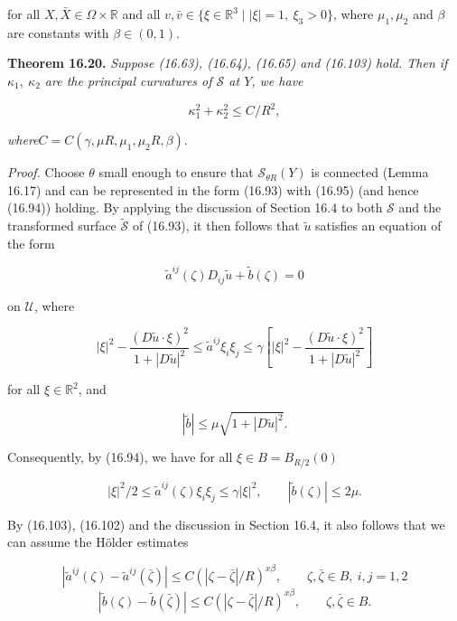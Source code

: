 for all $X,\bar X\in\Omega\times\mathbb{R}$ and all $v,\bar v\in\{\xi\in\mathbb{R}^3\mid |\xi|=1,\ \xi_3>0\}$, where $\mu_1,\mu_2$ and $\beta$ are
constants with $\beta\in(0,1)$.

\textbf{Theorem 16.20.} \textit{Suppose (16.63), (16.64), (16.65) and (16.103) hold. Then if $\kappa_1,\ \kappa_2$
are the principal curvatures of $\mathcal{S}$ at $Y$, we have}

\begin{equation}
\kappa_1^2+\kappa_2^2\le C/R^2,
\tag{16.104}
\end{equation}

\noindent\textit{where}\qquad $C=C(\gamma,\mu R,\mu_1,\mu_2 R,\beta)$.

\textit{Proof.} Choose $\theta$ small enough to ensure that $\mathcal{S}_{\theta R}(Y)$ is connected (Lemma 16.17)
and can be represented in the form (16.93) with (16.95) (and hence (16.94)) holding.
By applying the discussion of Section 16.4 to both $\mathcal{S}$ and the transformed surface
$\tilde{\mathcal{S}}$ of (16.93), it then follows that $\tilde u$ satisfies an equation of the form

\begin{equation}
\tilde a^{ij}(\zeta)D_{ij}\tilde u+\tilde b(\zeta)=0
\tag{16.105}
\end{equation}



on $\mathcal U$, where

\[
|\xi|^2-\frac{(D\tilde u\cdot \xi)^2}{1+|D\tilde u|^2}
\leq \tilde a^{ij}\xi_i\xi_j
\leq \gamma\left[|\xi|^2-\frac{(D\tilde u\cdot \xi)^2}{1+|D\tilde u|^2}\right]
\]

for all $\xi\in \mathbb R^2$, and

\[
|\tilde b|\leq \mu\sqrt{1+|D\tilde u|^2}.
\]

Consequently, by (16.94), we have for all $\xi\in B=B_{R/2}(0)$

\begin{equation}\tag{16.106}
|\xi|^2/2\leq \tilde a^{ij}(\zeta)\xi_i\xi_j\leq \gamma|\xi|^2,
\qquad
|\tilde b(\zeta)|\leq 2\mu.
\end{equation}

By (16.103), (16.102) and the discussion in Section 16.4, it also follows that we can
assume the H\"older estimates

\begin{equation}\tag{16.107}
\left|\tilde a^{ij}(\zeta)-\tilde a^{ij}(\bar\zeta)\right|
\leq C(|\zeta-\bar\zeta|/R)^{x\beta},
\qquad \zeta,\bar\zeta\in B,\ i,j=1,2
\end{equation}
\[
\left|\tilde b(\zeta)-\tilde b(\bar\zeta)\right|
\leq C(|\zeta-\bar\zeta|/R)^{x\beta},
\qquad \zeta,\bar\zeta\in B.
\]

